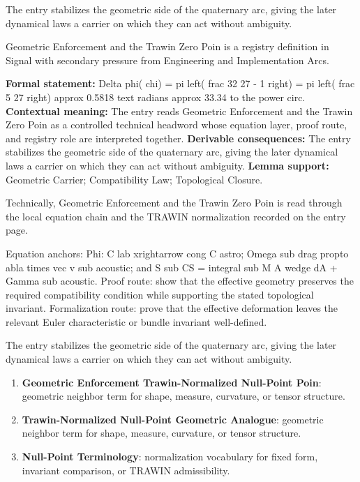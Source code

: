 The entry stabilizes the geometric side of the quaternary arc, giving the later dynamical laws a carrier on which they can act without ambiguity.
\clearpage


\begingroup\small
{}
Geometric Enforcement and the Trawin Zero Poin is a registry definition in Signal with secondary pressure from Engineering and Implementation Arcs.

\begingroup\footnotesize\setlength{\emergencystretch}{3em}\sloppy
\textbf{Formal statement:} Delta phi( chi) = pi left( frac 32 27 - 1 right) = pi left( frac 5 27 right) approx 0.5818 text radians approx 33.34 to the power circ. \textbf{Contextual meaning:} The entry reads Geometric Enforcement and the Trawin Zero Poin as a controlled technical headword whose equation layer, proof route, and registry role are interpreted together. \textbf{Derivable consequences:} The entry stabilizes the geometric side of the quaternary arc, giving the later dynamical laws a carrier on which they can act without ambiguity. \textbf{Lemma support:} Geometric Carrier; Compatibility Law; Topological Closure.\par
\endgroup

Technically, Geometric Enforcement and the Trawin Zero Poin is read through the local equation chain and the TRAWIN normalization recorded on the entry page.

Equation anchors: Phi: C lab xrightarrow cong C astro; Omega sub drag propto abla times vec v sub acoustic; and S sub CS = integral sub M A wedge dA + Gamma sub acoustic. Proof route: show that the effective geometry preserves the required compatibility condition while supporting the stated topological invariant. Formalization route: prove that the effective deformation leaves the relevant Euler characteristic or bundle invariant well-defined.

The entry stabilizes the geometric side of the quaternary arc, giving the later dynamical laws a carrier on which they can act without ambiguity.
\endgroup

\begin{enumerate}[leftmargin=1.6em,itemsep=6pt,topsep=4pt]
\item \textbf{Geometric Enforcement Trawin-Normalized Null-Point Poin}: geometric neighbor term for shape, measure, curvature, or tensor structure.
\item \textbf{Trawin-Normalized Null-Point Geometric Analogue}: geometric neighbor term for shape, measure, curvature, or tensor structure.
\item \textbf{Null-Point Terminology}: normalization vocabulary for fixed form, invariant comparison, or TRAWIN admissibility.
\end{enumerate}

